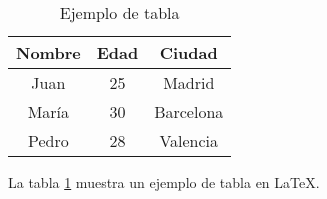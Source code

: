 \documentclass{article}
\begin{document}
\begin{table}[h]
\centering
\begin{tabular}{|c|c|c|}
\hline
Nombre & Edad & Ciudad \\
\hline
Juan & 25 & Madrid \\
María & 30 & Barcelona \\
Pedro & 28 & Valencia \\
\hline
\end{tabular}
\caption{Ejemplo de tabla}
\label{tab:ejemplo}
\end{table}
La tabla \ref{tab:ejemplo} muestra un ejemplo de tabla en LaTeX.
\end{document}
